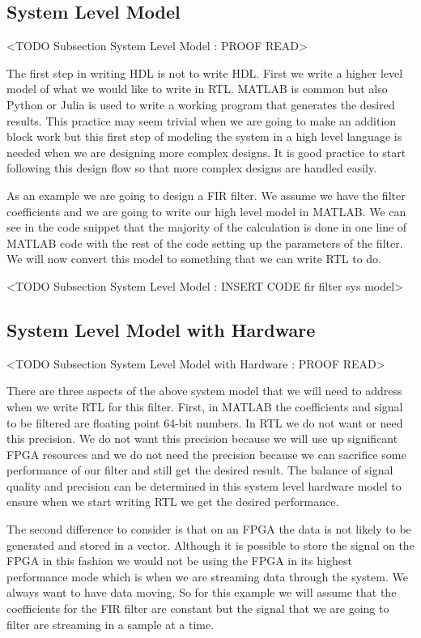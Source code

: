 \subsection{System Level Model}
	<TODO Subsection System Level Model : PROOF READ>

The first step in writing \ac{HDL} is not to write \ac{HDL}. First we write a higher level model of what we would like to write in \ac{RTL}. MATLAB is common but also Python or Julia is used to write a working program that generates the desired results. This practice may seem trivial when we are going to make an addition block work but this first step of modeling the system in a high level language is needed when we are designing more complex designs. It is good practice to start following this design flow so that more complex designs are handled easily.

As an example we are going to design a \ac{FIR} filter. We assume we have the filter coefficients and we are going to write our high level model in MATLAB. We can see in the code snippet that the majority of the calculation is done in one line of MATLAB code with the rest of the code setting up the parameters of the filter. We will now convert this model to something that we can write \ac{RTL} to do.

	<TODO Subsection System Level Model : INSERT CODE fir filter sys model>
	
\subsection{System Level Model with Hardware}
	<TODO Subsection System Level Model with Hardware : PROOF READ>

There are three aspects of the above system model that we will need to address when we write \ac{RTL} for this filter. First, in MATLAB the coefficients and signal to be filtered are floating point 64-bit numbers. In \ac{RTL} we do not want or need this precision. We do not want this precision because we will use up significant \ac{FPGA} resources and we do not need the precision because we can sacrifice some performance of our filter and still get the desired result. The balance of signal quality and precision can be determined in this system level hardware model to ensure when we start writing \ac{RTL} we get the desired performance.

The second difference to consider is that on an \ac{FPGA} the data is not likely to be generated and stored in a vector. Although it is possible to store the signal on the \ac{FPGA} in this fashion we would not be using the \ac{FPGA} in its highest performance mode which is when we are streaming data through the system. We always want to have data moving. So for this example we will assume that the coefficients for the \ac{FIR} filter are constant but the signal that we are going to filter are streaming in a sample at a time.

